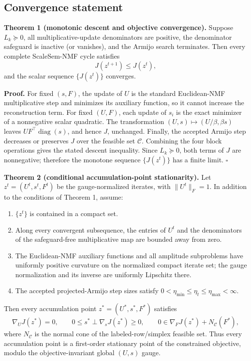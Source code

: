 \documentclass[a4paper,preprint,12pt]{elsarticle}
\theoremstyle{remark}
\newcommand{\diag}{\operatorname{diag}}
\begin{document}
\subsection{Convergence statement}

\textbf{Theorem 1 (monotonic descent and objective convergence).}
Suppose \(L_k\succeq0\), all multiplicative-update denominators are positive, the denominator safeguard is inactive (or vanishes), and the Armijo search terminates. Then every complete ScaleSem-NMF cycle satisfies
\[
J(z^{t+1})\le J(z^t),
\]
and the scalar sequence \(\{J(z^t)\}\) converges.

\textbf{Proof.}
For fixed \((s,F)\), the update of \(U\) is the standard Euclidean-NMF multiplicative step and minimizes its auxiliary function, so it cannot increase the reconstruction term. For fixed \((U,F)\), each update of \(s_i\) is the exact minimizer of a nonnegative scalar quadratic. The transformation \((U,s)\mapsto(U/\beta,\beta s)\) leaves \(UF^\top\diag(s)\), and hence \(J\), unchanged. Finally, the accepted Armijo step decreases or preserves \(J\) over the feasible set \(\mathcal C\). Combining the four block operations gives the stated descent inequality. Since \(L_k\succeq0\), both terms of \(J\) are nonnegative; therefore the monotone sequence \(\{J(z^t)\}\) has a finite limit. \(\square\)

\textbf{Theorem 2 (conditional accumulation-point stationarity).}
Let \(z^t=(U^t,s^t,F^t)\) be the gauge-normalized iterates, with \(\lVert U^t\rVert_F=1\). In addition to the conditions of Theorem 1, assume:
\begin{enumerate}[label=(A\arabic*),leftmargin=10mm,itemsep=1pt,topsep=2pt]
\item \(\{z^t\}\) is contained in a compact set.
\item Along every convergent subsequence, the entries of \(U^t\) and the denominators of the safeguard-free multiplicative map are bounded away from zero.
\item The Euclidean-NMF auxiliary functions and all amplitude subproblems have uniformly positive curvature on the normalized compact iterate set; the gauge normalization and its inverse are uniformly Lipschitz there.
\item The accepted projected-Armijo step sizes satisfy \(0<\eta_{\min}\le\eta_t\le\eta_{\max}<\infty\).
\end{enumerate}
Then every accumulation point \(z^*=(U^*,s^*,F^*)\) satisfies
\[
\nabla_UJ(z^*)=0,\qquad
0\le s^*\perp \nabla_sJ(z^*)\ge0,
\qquad
0\in\nabla_FJ(z^*)+N_{\mathcal C}(F^*),
\]
where \(N_{\mathcal C}\) is the normal cone of the labeled-row/simplex feasible set. Thus every accumulation point is a first-order stationary point of the constrained objective, modulo the objective-invariant global \((U,s)\) gauge.
\end{document}
